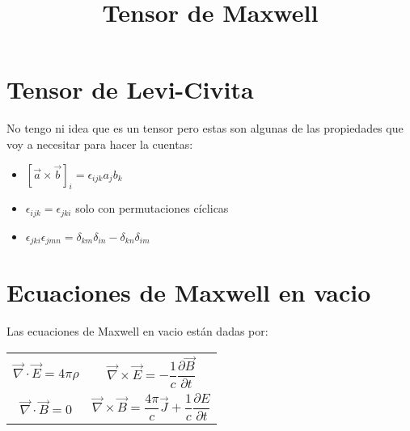 \documentclass[]{article}
\title{\Huge Tensor de Maxwell}
\author{}
\date{}
\begin{document}
\maketitle

\section*{Tensor de Levi-Civita}
No tengo ni idea que es un tensor pero estas son algunas de las propiedades que voy a necesitar
para hacer la cuentas:

\begin{itemize}
    \item $\left[ \vec{a} \times \vec{b} \right]_i = \epsilon_{ijk} a_j b_k$
    \item $\epsilon_{ijk} = \epsilon_{jki}$ solo con permutaciones cíclicas
    \item $\epsilon_{jki} \epsilon_{jmn} = \delta_{km} \delta_{in} - \delta_{kn} \delta_{im}$
\end{itemize}

\section*{Ecuaciones de Maxwell en vacio}
Las ecuaciones de Maxwell en vacio están dadas por:

\begin{table}[h]
\begin{tabular}{cc}

\begin{minipage}{0.4\textwidth}
\begin{equation}
    \vec{\nabla} \cdot \vec{E} = 4 \pi \rho
    \label{eq: div E}
\end{equation}
\end{minipage}

&
\quad

\begin{minipage}{0.4\textwidth}
\begin{equation}
    \vec{\nabla} \times \vec{E} = -\frac{1}{c} \frac{\partial \vec{B}}{\partial t}
    \label{eq: rot E}
\end{equation}
\end{minipage}


\\

\begin{minipage}{0.4\textwidth}
\begin{equation}
    \vec{\nabla} \cdot \vec{B} = 0
    \label{eq: div B}
\end{equation}
\end{minipage}

&
\quad

\begin{minipage}{0.4\textwidth}
\begin{equation}
    \vec{\nabla} \times \vec{B} = \frac{4 \pi}{c} \vec{J} + \frac{1}{c} \frac{\partial E}{\partial t}
    \label{eq: rot B}
\end{equation}
\end{minipage}

\end{tabular}
\end{table}
\end{document}
